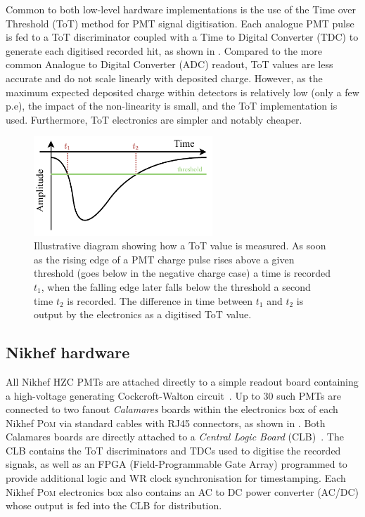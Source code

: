 Common to both low-level hardware implementations is the use of the Time over Threshold (ToT)
method for PMT signal digitisation. Each analogue PMT pulse is fed to a ToT discriminator coupled
with a Time to Digital Converter (TDC) to generate each digitised recorded hit, as shown in
. Compared to the more common Analogue to Digital Converter (ADC) readout, ToT
values are less accurate and do not scale linearly with deposited charge. However, as the maximum
expected deposited charge within \chips detectors is relatively low (only a few p.e), the impact
of the non-linearity is small, and the ToT implementation is used. Furthermore, ToT electronics
are simpler and notably cheaper.

\begin{figure} %
    \includegraphics[width=0.6\textwidth]{diagrams/5-daq/tot.pdf}
    \caption[Illustrative diagram showing how Time over Threshold is measured]
    {Illustrative diagram showing how a ToT value is measured. As soon as the rising edge of a PMT
        charge pulse rises above a given threshold (goes below in the negative charge case) a time
        is recorded $t_{1}$, when the falling edge later falls below the threshold a second time
        $t_{2}$ is recorded. The difference in time between $t_{1}$ and $t_{2}$ is output by the
        electronics as a digitised ToT value.}
    \label{fig:tot}
\end{figure}

\subsection{Nikhef hardware} %
\label{sec:daq_hard_Nikhed} %

All Nikhef HZC PMTs are attached directly to a simple readout board containing a high-voltage
generating Cockcroft-Walton circuit~\cite{cockcroft1932}. Up to 30 such PMTs are connected to two
fanout \emph{Calamares} boards within the electronics box of each Nikhef \textsc{Pom} via standard
cables with RJ45 connectors, as shown in . Both Calamares boards are
directly attached to a \emph{Central Logic Board} (CLB)~\cite{biagi2015, eijk2015}. The CLB
contains the ToT discriminators and TDCs used to digitise the recorded signals, as well as an FPGA
(Field-Programmable Gate Array) programmed to provide additional logic and WR clock
synchronisation for timestamping. Each Nikhef \textsc{Pom} electronics box also contains an AC to
DC power converter (AC/DC) whose output is fed into the CLB for distribution.

